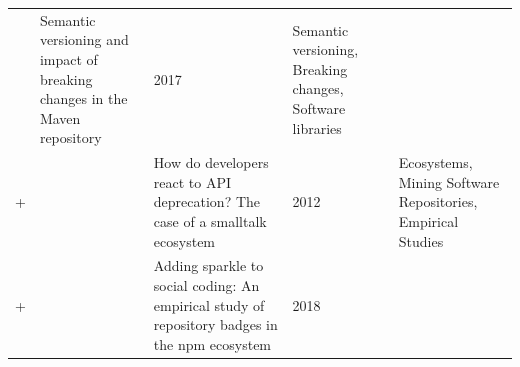 \documentclass[]{book}
\begin{document}
\begin{longtable}[]{@{}lllll@{}}
\begin{minipage}[t]{0.09\columnwidth}
\citet{Raemaekers2017}\strut
\end{minipage} & \begin{minipage}[t]{0.34\columnwidth}\raggedright\strut
Semantic versioning and impact of breaking changes in the Maven
repository\strut
\end{minipage} & \begin{minipage}[t]{0.02\columnwidth}\raggedright\strut
2017\strut
\end{minipage} & \begin{minipage}[t]{0.39\columnwidth}\raggedright\strut
Semantic versioning, Breaking changes, Software libraries\strut
\end{minipage}\tabularnewline
\begin{minipage}[t]{0.01\columnwidth}\raggedright\strut
+\strut
\end{minipage} & \begin{minipage}[t]{0.09\columnwidth}\raggedright\strut
\citet{Robbes2012}\strut
\end{minipage} & \begin{minipage}[t]{0.34\columnwidth}\raggedright\strut
How do developers react to API deprecation? The case of a smalltalk
ecosystem\strut
\end{minipage} & \begin{minipage}[t]{0.02\columnwidth}\raggedright\strut
2012\strut
\end{minipage} & \begin{minipage}[t]{0.39\columnwidth}\raggedright\strut
Ecosystems, Mining Software Repositories, Empirical Studies\strut
\end{minipage}\tabularnewline
\begin{minipage}[t]{0.01\columnwidth}\raggedright\strut
+\strut
\end{minipage} & \begin{minipage}[t]{0.09\columnwidth}\raggedright\strut
\citet{Trockman2018}\strut
\end{minipage} & \begin{minipage}[t]{0.34\columnwidth}\raggedright\strut
Adding sparkle to social coding: An empirical study of repository badges
in the npm ecosystem\strut
\end{minipage} & \begin{minipage}[t]{0.02\columnwidth}\raggedright\strut
2018\strut
\end{minipage} & \begin{minipage}[t]{0.39\columnwidth}\raggedright\strut
\strut
\end{minipage}\tabularnewline
\bottomrule
\end{longtable}
\end{document}
